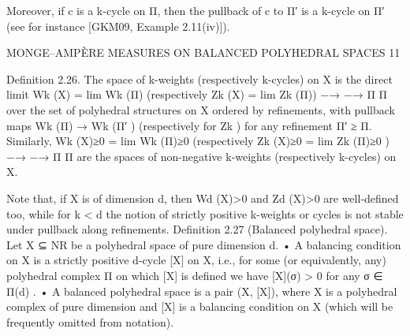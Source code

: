 \documentclass[
  11pt,
]{article}
\newenvironment{Shaded}{}{}
\newcommand{\NormalTok}[1]{#1}
\begin{document}
\begin{Shaded}
\begin{Highlighting}[]
\NormalTok{  Moreover, if c is a k{-}cycle on Π, then the pullback of c to Π′ is a k{-}cycle on Π′ (see for instance}
\NormalTok{[GKM09, Example 2.11(iv)]).}

\NormalTok{                  MONGE–AMPÈRE MEASURES ON BALANCED POLYHEDRAL SPACES                            11}


\NormalTok{Definition 2.26. The space of k{-}weights (respectively k{-}cycles) on X is the direct limit}
\NormalTok{                     Wk (X) = lim Wk (Π)     (respectively    Zk (X) = lim Zk (Π))}
\NormalTok{                              −→                                       −→}
\NormalTok{                                  Π                                     Π}
\NormalTok{over the set of polyhedral structures on X ordered by refinements, with pullback maps Wk (Π) →}
\NormalTok{Wk (Π′ ) (respectively for Zk ) for any refinement Π′ ≥ Π.}
\NormalTok{   Similarly,}
\NormalTok{                Wk (X)≥0 = lim Wk (Π)≥0      (respectively    Zk (X)≥0 = lim Zk (Π)≥0 )}
\NormalTok{                           −→                                            −→}
\NormalTok{                              Π                                             Π}
\NormalTok{are the spaces of non{-}negative k{-}weights (respectively k{-}cycles) on X.}

\NormalTok{    Note that, if X is of dimension d, then Wd (X)\textgreater{}0 and Zd (X)\textgreater{}0 are well{-}defined too, while}
\NormalTok{for k \textless{} d the notion of strictly positive k{-}weights or cycles is not stable under pullback along}
\NormalTok{refinements.}
\NormalTok{Definition 2.27 (Balanced polyhedral space). Let X ⊆ NR be a polyhedral space of pure}
\NormalTok{dimension d.}
\NormalTok{     • A balancing condition on X is a strictly positive d{-}cycle [X] on X, i.e., for some (or}
\NormalTok{       equivalently, any) polyhedral complex Π on which [X] is defined we have [X](σ) \textgreater{} 0 for any}
\NormalTok{       σ ∈ Π(d) .}
\NormalTok{     • A balanced polyhedral space is a pair (X, [X]), where X is a polyhedral complex of pure}
\NormalTok{       dimension and [X] is a balancing condition on X (which will be frequently omitted from}
\NormalTok{       notation).}


\end{Highlighting}
\end{Shaded}
\end{document}
